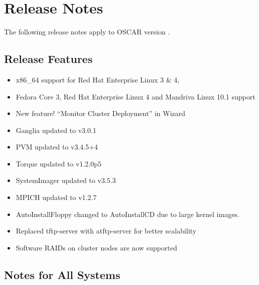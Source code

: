 %
%
%
%

\section{Release Notes}
\label{sec:release-notes}

The following release notes apply to OSCAR version \oscarversion.
\subsection{Release Features}
\label{subsec:release-features}

\begin{itemize}

\item x86\_64 support for Red Hat Enterprise Linux 3 \& 4,
\item Fedora Core 3, Red Hat Enterprise Linux 4 and 
      Mandriva Linux 10.1 support
\item New feature! ``Monitor Cluster Deployment'' in Wizard
\item Ganglia updated to v3.0.1
\item PVM updated to v3.4.5+4
\item Torque updated to v1.2.0p5
\item SystemImager updated to v3.5.3
\item MPICH updated to v1.2.7
\item AutoInstallFloppy changed to AutoInstallCD due to large kernel images.
\item Replaced tftp-server with atftp-server for better scalability
\item Software RAIDs on cluster nodes are now supported

\end{itemize}

\subsection{Notes for All Systems}
\label{subsec:release-notes}

